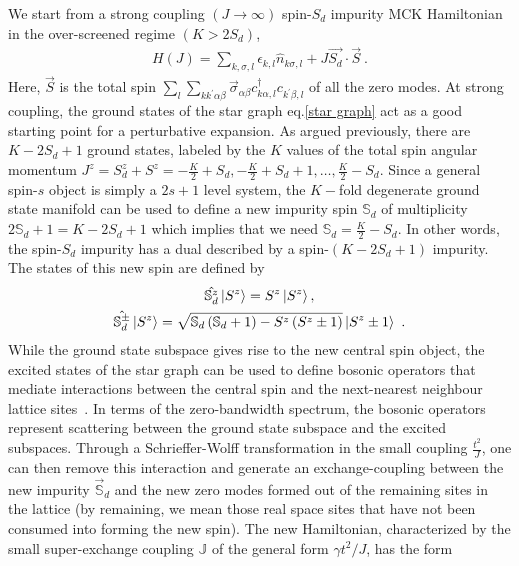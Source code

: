 \documentclass[reprint,prb,superscriptaddress]{revtex4-2}
\begin{document}
We start from a strong coupling \((J \to \infty)\) spin-\(S_{d}\) impurity MCK Hamiltonian in the over-screened regime \(\left( K > 2S_{d} \right) \),
\begin{equation}\begin{aligned}
	\label{strong_ham}
	H(J) = \sum_{k,\sigma,l}\epsilon_{k,l} \hat n_{k\sigma,l} + J \vec{S_d}\cdot\vec{S}~.
\end{aligned}\end{equation}
Here, \(\vec S\) is the total spin \(\sum_l \sum_{kk^\prime \alpha\beta} \vec \sigma_{\alpha\beta}c^\dagger_{k\alpha,l}c_{k^\prime\beta,l}\) of all the zero modes. At strong coupling, the ground states of the star graph eq.\eqref{star graph} act as a good starting point for a perturbative expansion. As argued previously, there are \(K-2S_d+1\) ground states, labeled by the \(K\) values of the total spin angular momentum \(J^z = S_d^z + S^z = -\frac{K}{2} + S_d, -\frac{K}{2} + S_d + 1, \ldots, \frac{K}{2} - S_d\). Since a general spin-\(s\) object is simply a \(2s+1\) level system, the \(K-\)fold degenerate ground state manifold can be used to define a new impurity spin \(\mathbb{S}_d\) of multiplicity \(2\mathbb{S}_d + 1 = K-2S_d+1\) which implies that we need \(\mathbb{S}_d = \frac{K}{2} - S_d\). In other words, the spin-\(S_d\) impurity has a dual described by a spin-\((K-2S_d+1)\) impurity. The states of this new spin are defined by
\begin{gather}
	\hat{\mathbb{S}_d^z} \ket{S^z} = S^z \ket{S^z},\nonumber\\
	\hat{\mathbb{S}_d^\pm} \ket{S^z} = \sqrt{\mathbb{S}_d\left( \mathbb{S}_d + 1 \right) - S^z\left( S^z \pm 1\right)} \ket{S^z \pm 1}~.
\end{gather}
While the ground state subspace gives rise to the new central spin object, the excited states of the star graph can be used to define bosonic operators that mediate interactions between the central spin and the next-nearest neighbour lattice sites~\cite{kroha_kolf_2007}. In terms of the zero-bandwidth spectrum, the bosonic operators represent scattering between the ground state subspace and the excited subspaces. Through a Schrieffer-Wolff transformation in the small coupling \(\frac{t^2}{J}\), one can then remove this interaction and generate an exchange-coupling between the new impurity \(\vec {\mathbb{S}}_d\) and the new zero modes formed out of the remaining sites in the lattice \cite{kroha_kolf_2007} (by remaining, we mean those real space sites that have not been consumed into forming the new spin). The new Hamiltonian, characterized by the small super-exchange  coupling \(\mathbb{J}\) of the general form \(\gamma t^2/J\), has the form
\end{document}
